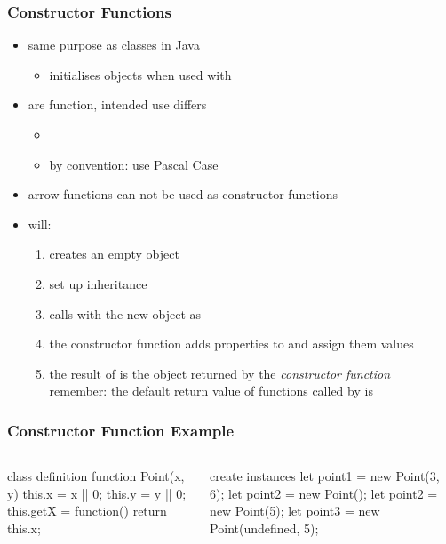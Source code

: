 \begin{frame}[fragile] \frametitle{Constructor Functions}

\begin{itemize}
  \item same purpose as classes in Java
  \begin{itemize}
    \item initialises objects when used with 
  \end{itemize}
  \item are	 function, intended use differs
  \begin{itemize}
    \item {}
    \item by convention: use Pascal Case
  \end{itemize}
  \item arrow functions can not be used as constructor functions
  \item {} will:
  \begin{enumerate}
    \item creates an empty object
    \item set up inheritance
    \item calls  with the new object as 
    \item the constructor function adds properties to  and assign them values
    \item the result of  is the object returned by the \emph{constructor function}\\
             remember: the default return value of functions called by  is 
  \end{enumerate}
\end{itemize}
\end{frame}

\begin{frame}[fragile] \frametitle{Constructor Function Example}

\begin{columns}[onlytextwidth]
  \begin{column}{0.5\textwidth}
\begin{CodeBox}{class definition}
function Point(x, y) {
  this.x = x || 0;
  this.y = y || 0;
  this.getX = function() {
    return this.x;
  }
}
\end{CodeBox}
  \end{column}
  \begin{column}{0.5\textwidth}
\begin{CodeBox}{create instances}
let point1 = new Point(3, 6);
let point2 = new Point();
let point2 = new Point(5);
let point3 = 
  new Point(undefined, 5);
\end{CodeBox}
  \end{column}
\end{columns}%
\end{frame}

